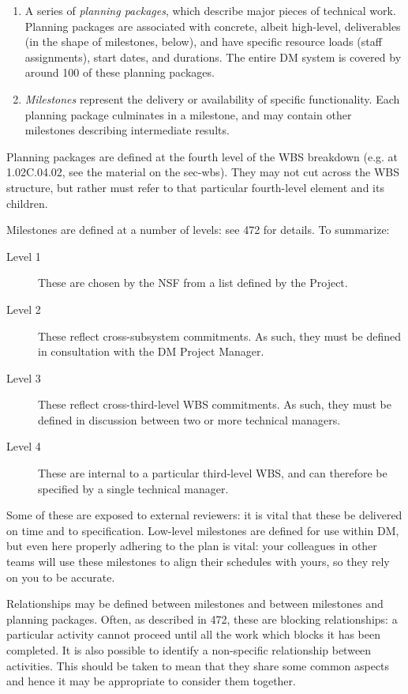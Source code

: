 \begin{enumerate}
\item
  A series of \emph{planning packages}, which describe major pieces of
  technical work. Planning packages are associated with concrete, albeit
  high-level, deliverables (in the shape of milestones, below), and have
  specific resource loads (staff assignments), start dates, and
  durations. The entire DM system is covered by around 100 of these
  planning packages.
\item
  \emph{Milestones} represent the delivery or availability of specific
  functionality. Each planning package culminates in a milestone, and
  may contain other milestones describing intermediate results.
\end{enumerate}

Planning packages are defined at the fourth level of the WBS breakdown
(e.g. at 1.02C.04.02, see the material on the sec-wbs). They may not cut
across the WBS structure, but rather must refer to that particular
fourth-level element and its children.

Milestones are defined at a number of levels: see 472 for details. To
summarize:

\begin{description}
\item[Level 1]
These are chosen by the NSF from a list defined by the Project.
\item[Level 2]
These reflect cross-subsystem commitments. As such, they must be defined
in consultation with the DM Project Manager.
\item[Level 3]
These reflect cross-third-level WBS commitments. As such, they must be
defined in discussion between two or more technical managers.
\item[Level 4]
These are internal to a particular third-level WBS, and can therefore be
specified by a single technical manager.
\end{description}

Some of these are exposed to external reviewers: it is vital that these
be delivered on time and to specification. Low-level milestones are
defined for use within DM, but even here properly adhering to the plan
is vital: your colleagues in other teams will use these milestones to
align their schedules with yours, so they rely on you to be accurate.

Relationships may be defined between milestones and between milestones
and planning packages. Often, as described in 472, these are blocking
relationships: a particular activity cannot proceed until all the work
which blocks it has been completed. It is also possible to identify a
non-specific relationship between activities. This should be taken to
mean that they share some common aspects and hence it may be appropriate
to consider them together.

